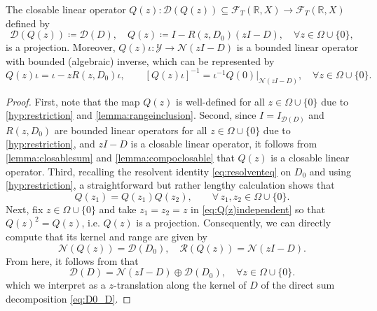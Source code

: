 \documentclass[english]{myarticle}
\begin{document}
\begin{sloppypar}
\begin{lemma} \label{lemma:Q(z)closable}
The closable linear operator $Q(z) : \mathcal{D}(Q(z)) \subseteq \mathcal{F}_T(\mathbb{R},X) \to \mathcal{F}_T(\mathbb{R},X)$ defined by
\begin{equation} \label{eq:actionQ}
    \mathcal{D}(Q(z)) \coloneqq \mathcal{D}(D), \quad Q(z) \coloneqq I - R(z,D_0)(zI - D), \quad \forall z \in \Omega \cup \{0\},
\end{equation}
is a projection. Moreover, $Q(z) \iota: \mathcal{Y} \to \mathcal{N}(zI-D)$ is a bounded linear operator with bounded (algebraic) inverse, which can be represented by
\begin{equation} \label{eq:Q(z)iota}
    Q(z)\iota = \iota - zR(z,D_0)\iota, \qquad [Q(z)\iota]^{-1} = \iota^{-1} Q(0) |_{\mathcal{N}(zI-D)}, \quad \forall z \in \Omega \cup \{0\}.
\end{equation}
\end{lemma}
\begin{proof}
First, note that the map $Q(z)$ is well-defined for all $z \in \Omega \cup \{0\}$ due to \ref{hyp:restriction} and \cref{lemma:rangeinclusion}. Second, since $I = I_{\mathcal{D}(D)}$ and $R(z,D_0)$ are bounded linear operators for all $z \in \Omega \cup \{0\}$ due to \ref{hyp:restriction}, and $zI-D$ is a closable linear operator, it follows from \cref{lemma:closablesum} and \cref{lemma:compoclosable} that $Q(z)$ is a closable linear operator. Third, recalling the resolvent identity \eqref{eq:resolventeq} on $D_0$ and using \ref{hyp:restriction}, a straightforward but rather lengthy calculation shows that
\begin{equation} \label{eq:Q(z)independent}
    Q(z_1) = Q(z_1) Q(z_2), \qquad \forall\, z_1, z_2 \in \Omega \cup \{0\}.
\end{equation}
Next, fix $z \in \Omega \cup \{0 \}$ and take $z_1 = z_2 = z$ in \eqref{eq:Q(z)independent} so that $Q(z)^2 = Q(z)$, i.e. $Q(z)$ is a projection. Consequently, we can directly compute that its kernel and range are given by
\begin{equation} \label{eq:propQ(z)}
    \mathcal{N}(Q(z)) = \mathcal{D}(D_0), \quad \mathcal{R}(Q(z)) = \mathcal{N}(zI - D).
\end{equation}
From here, it follows from \cite[Equation (4.8-2)]{Taylor1986} that
\begin{equation*}
    \mathcal{D}(D) = \mathcal{N}(zI- D) \oplus \mathcal{D}(D_0), \quad \forall z \in \Omega \cup \{0\}.
\end{equation*}
which we interpret as a $z$-translation along the kernel of $D$ of the direct sum decomposition \eqref{eq:D0_D}.


\end{proof}
\end{sloppypar}
\end{document}
